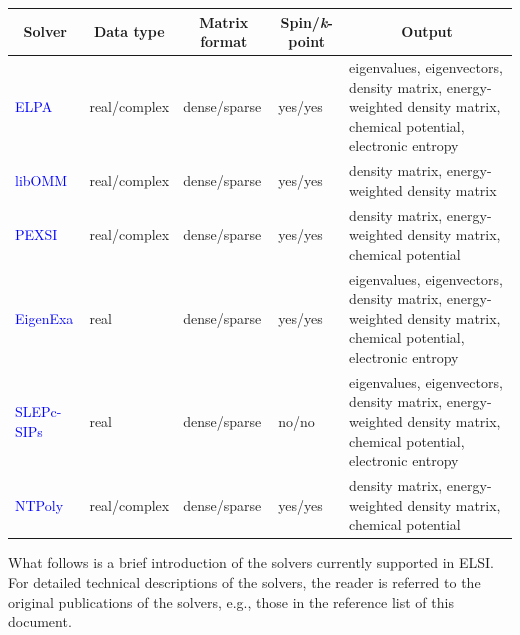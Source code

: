 \documentclass{report}
\begin{document}
\begin{tabular}[]{|p{20mm}|p{25mm}|p{25mm}|p{25mm}|p{70mm}|}
\hline
\multicolumn{1}{|c|}{\textbf{Solver}} & \multicolumn{1}{c|}{\textbf{Data type}} & \multicolumn{1}{c|}{\textbf{Matrix format}} & \multicolumn{1}{c|}{\textbf{Spin/\textit{k}-point}} & \multicolumn{1}{c|}{\textbf{Output}}\\
\hline
\textcolor{blue}{ELPA}       & real/complex & dense/sparse & yes/yes & eigenvalues, eigenvectors, density matrix, energy-weighted density matrix, chemical potential, electronic entropy\\
\hline
\textcolor{blue}{libOMM}     & real/complex & dense/sparse & yes/yes & density matrix, energy-weighted density matrix\\
\hline
\textcolor{blue}{PEXSI}      & real/complex & dense/sparse & yes/yes & density matrix, energy-weighted density matrix, chemical potential\\
\hline
\textcolor{blue}{EigenExa}   & real         & dense/sparse & yes/yes & eigenvalues, eigenvectors, density matrix, energy-weighted density matrix, chemical potential, electronic entropy\\
\hline
\textcolor{blue}{SLEPc-SIPs} & real         & dense/sparse & no/no   & eigenvalues, eigenvectors, density matrix, energy-weighted density matrix, chemical potential, electronic entropy\\
\hline
\textcolor{blue}{NTPoly}     & real/complex & dense/sparse & yes/yes & density matrix, energy-weighted density matrix, chemical potential\\
\hline
\end{tabular}

What follows is a brief introduction of the solvers currently supported in ELSI. For detailed technical descriptions of the solvers, the reader is referred to the original publications of the solvers, e.g., those in the reference list of this document.
\end{document}
